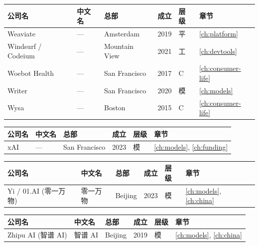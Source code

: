 \bigskip

\nopagebreak
\begin{tabularx}{\textwidth}{@{}l X l l l l@{}}
\toprule
\rowcolor{figLightGray}
\textbf{公司名} & \textbf{中文名} & \textbf{总部} & \textbf{成立} & \textbf{层级} & \textbf{章节} \\
\midrule
Weaviate            & ---             & Amsterdam     & 2019 & 平   & \ref{ch:platform} \\
Windsurf / Codeium  & ---             & Mountain View & 2021 & 工   & \ref{ch:devtools} \\
Woebot Health       & ---             & San Francisco & 2017 & C    & \ref{ch:consumer-life} \\
Writer              & ---             & San Francisco & 2020 & 模   & \ref{ch:models} \\
Wysa                & ---             & Boston        & 2015 & C    & \ref{ch:consumer-life} \\
\bottomrule
\end{tabularx}

\bigskip

\nopagebreak
\begin{tabularx}{\textwidth}{@{}l X l l l l@{}}
\toprule
\rowcolor{figLightGray}
\textbf{公司名} & \textbf{中文名} & \textbf{总部} & \textbf{成立} & \textbf{层级} & \textbf{章节} \\
\midrule
xAI                 & ---             & San Francisco & 2023 & 模   & \ref{ch:models}, \ref{ch:funding} \\
\bottomrule
\end{tabularx}

\bigskip

\nopagebreak
\begin{tabularx}{\textwidth}{@{}l X l l l l@{}}
\toprule
\rowcolor{figLightGray}
\textbf{公司名} & \textbf{中文名} & \textbf{总部} & \textbf{成立} & \textbf{层级} & \textbf{章节} \\
\midrule
Yi / 01.AI (零一万物) & 零一万物      & Beijing       & 2023 & 模   & \ref{ch:models}, \ref{ch:china} \\
\bottomrule
\end{tabularx}

\bigskip

\nopagebreak
\begin{tabularx}{\textwidth}{@{}l X l l l l@{}}
\toprule
\rowcolor{figLightGray}
\textbf{公司名} & \textbf{中文名} & \textbf{总部} & \textbf{成立} & \textbf{层级} & \textbf{章节} \\
\midrule
Zhipu AI (智谱 AI)  & 智谱 AI         & Beijing       & 2019 & 模   & \ref{ch:models}, \ref{ch:china} \\
\bottomrule
\end{tabularx}

